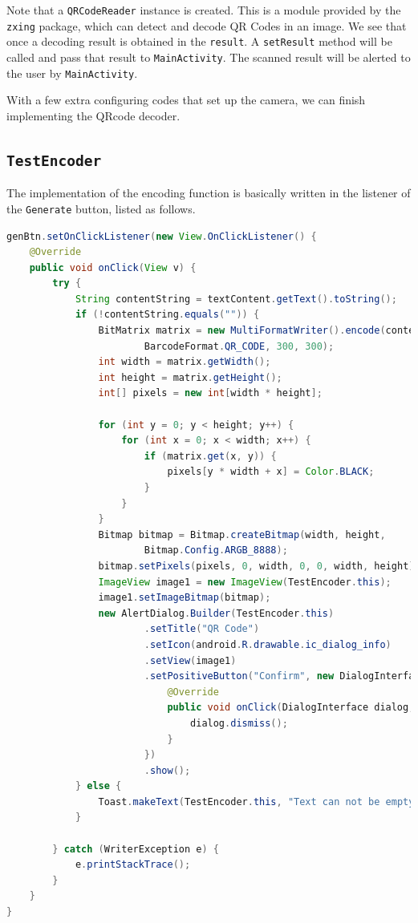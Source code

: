 Note that a \texttt{QRCodeReader} instance is created. This is a module provided by the \texttt{zxing} package, which can detect and decode QR Codes in an image. We see that once a decoding result is obtained in the \texttt{result}. A \texttt{setResult} method will be called and pass that result to \texttt{MainActivity}. The scanned result will be alerted to the user by \texttt{MainActivity}.

With a few extra configuring codes that set up the camera, we can finish implementing the QRcode decoder.


\subsection{\texttt{TestEncoder}}

The implementation of the encoding function is basically written in the listener of the \texttt{Generate} button, listed as follows.

\begin{lstlisting}[language=java]
genBtn.setOnClickListener(new View.OnClickListener() {
    @Override
    public void onClick(View v) {
        try {
            String contentString = textContent.getText().toString();
            if (!contentString.equals("")) {
                BitMatrix matrix = new MultiFormatWriter().encode(contentString,
                        BarcodeFormat.QR_CODE, 300, 300);
                int width = matrix.getWidth();
                int height = matrix.getHeight();
                int[] pixels = new int[width * height];

                for (int y = 0; y < height; y++) {
                    for (int x = 0; x < width; x++) {
                        if (matrix.get(x, y)) {
                            pixels[y * width + x] = Color.BLACK;
                        }
                    }
                }
                Bitmap bitmap = Bitmap.createBitmap(width, height,
                        Bitmap.Config.ARGB_8888);
                bitmap.setPixels(pixels, 0, width, 0, 0, width, height);
                ImageView image1 = new ImageView(TestEncoder.this);
                image1.setImageBitmap(bitmap);
                new AlertDialog.Builder(TestEncoder.this)
                        .setTitle("QR Code")
                        .setIcon(android.R.drawable.ic_dialog_info)
                        .setView(image1)
                        .setPositiveButton("Confirm", new DialogInterface.OnClickListener(){
                            @Override
                            public void onClick(DialogInterface dialog, int which) {
                                dialog.dismiss();
                            }
                        })
                        .show();
            } else {
                Toast.makeText(TestEncoder.this, "Text can not be empty", Toast.LENGTH_SHORT).show();
            }

        } catch (WriterException e) {
            e.printStackTrace();
        }
    }
}
\end{lstlisting}


